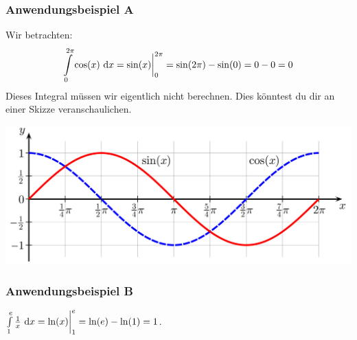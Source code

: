 \subsubsection*{Anwendungsbeispiel A}

Wir betrachten:
\begin{align*}
\int \limits_0^{2\pi} \cos(x) \ \text{\rmfamily d} x
= 
\sin(x) \bigg|_0^{2\pi} = \sin(2\pi) - \sin(0) = 0 -0 = 0
\end{align*}
Dieses Integral müssen wir eigentlich nicht berechnen.
Dies könntest du dir an einer Skizze veranschaulichen.
\begin{center}
	\includegraphics[scale=0.15]{sections/pics/Sine_cosine_one_period}
\end{center}

\subsubsection*{Anwendungsbeispiel B}
$\int \limits_1^e \frac{1}{x} \ \text{\rmfamily d} x
= \ln(x) \bigg|_1^e = \ln(e) - \ln(1) = 1$. 

